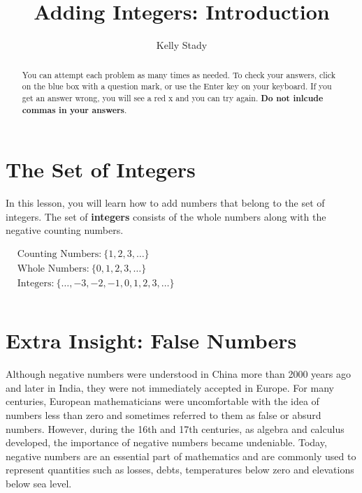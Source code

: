 \documentclass{ximera}[font=12pt]
\title{Adding Integers: Introduction}   %
\author{Kelly Stady}
\begin{document}
  

\begin{abstract}
You can attempt each problem as many times as needed. To check your answers, click on the 
blue box with a question mark, or use the Enter key on your keyboard.  If you get an answer wrong, you will see a red x and 
you can try again. \textbf{Do not inlcude commas in your answers}.

\end{abstract}

\maketitle
\label{xim:AddIntroActivity1}


\section*{The Set of Integers}

In this lesson, you will learn how to add numbers that belong to the set of integers.  The set of \textbf{integers} consists of the whole numbers along with the negative counting numbers.

\begin{flushleft}
\hspace{5em} %
$\begin{aligned}
& \textrm{Counting Numbers:} \ \{1, 2, 3, \dots\} \\[1.8ex]
& \textrm{Whole Numbers:} \ \{0, 1, 2, 3, \dots\} \\[1.8ex]
& \textrm{Integers:} \ \{ \ldots, -3, -2, -1, 0, 1, 2, 3, \ldots \} \\
& \\ %
\end{aligned} $
\end{flushleft}


\section*{Extra Insight: False Numbers}

Although negative numbers were understood in China more than 2000 years ago and later in India, they were not immediately accepted in Europe.
For many centuries, European mathematicians were uncomfortable with the idea of numbers less than zero and sometimes referred to them  as false or
absurd numbers.  However, during the 16th and 17th centuries, as algebra and calculus developed, the importance of negative numbers became undeniable.
Today, negative numbers are an essential part of mathematics and are commonly used to represent quantities such as losses, debts, temperatures below zero and
elevations below sea level.
\end{document}
